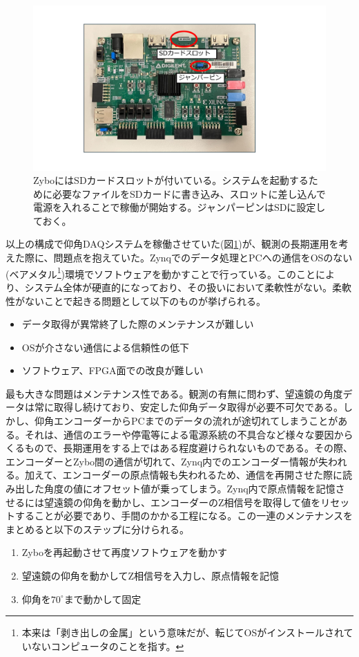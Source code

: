 \begin{figure}[htbp]
  \centering
  \includegraphics[width=0.6\columnwidth]{4_elDAQ/figs/sd_zybo2.pdf}
  \caption{ZyboにはSDカードスロットが付いている。システムを起動するために必要なファイルをSDカードに書き込み、スロットに差し込んで電源を入れることで稼働が開始する。ジャンパーピンはSDに設定しておく。}
  \label{sd_zybo}
\end{figure}

以上の構成で仰角DAQシステムを稼働させていた(図\ref{sd_zybo})が、観測の長期運用を考えた際に、問題点を抱えていた。Zynqでのデータ処理とPCへの通信をOSのない(ベアメタル\footnote{本来は「剥き出しの金属」という意味だが、転じてOSがインストールされていないコンピュータのことを指す。})環境でソフトウェアを動かすことで行っている。このことにより、システム全体が硬直的になっており、その扱いにおいて柔軟性がない。柔軟性がないことで起きる問題として以下のものが挙げられる。
\begin{itemize}
  \item データ取得が異常終了した際のメンテナンスが難しい
  \item OSが介さない通信による信頼性の低下
  \item ソフトウェア、FPGA面での改良が難しい
\end{itemize}

最も大きな問題はメンテナンス性である。観測の有無に問わず、望遠鏡の角度データは常に取得し続けており、安定した仰角データ取得が必要不可欠である。しかし、仰角エンコーダーからPCまでのデータの流れが途切れてしまうことがある。それは、通信のエラーや停電等による電源系統の不具合など様々な要因からくるもので、長期運用をする上ではある程度避けられないものである。その際、エンコーダーとZybo間の通信が切れて、Zynq内でのエンコーダー情報が失われる。加えて、エンコーダーの原点情報も失われるため、通信を再開させた際に読み出した角度の値にオフセット値が乗ってしまう。Zynq内で原点情報を記憶させるには望遠鏡の仰角を動かし、エンコーダーのZ相信号を取得して値をリセットすることが必要であり、手間のかかる工程になる。この一連のメンテナンスをまとめると以下のステップに分けられる。
\begin{enumerate}
  \item Zyboを再起動させて再度ソフトウェアを動かす
  \item 望遠鏡の仰角を動かしてZ相信号を入力し、原点情報を記憶
  \item 仰角を$70^{\circ}$まで動かして固定
\end{enumerate}

